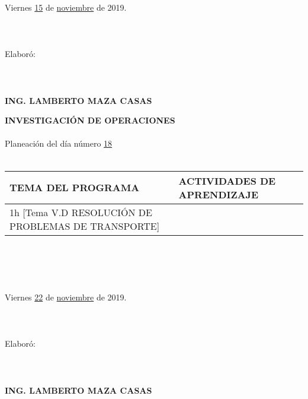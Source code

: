 \documentclass[landscape]{article}
\begin{document}
{\begin{center}
\ \\
\ \\
\ \\
Viernes \underline{\hspace{0.5cm}15\hspace{0.5cm}} de  \underline{\hspace{0.5cm}noviembre\hspace{0.5cm}} de 2019.
\ \\
\ \\
\ \\
\ \\
Elabor\'o:
\ \\
\ \\
\ \\
\ \\
{\bf ING. LAMBERTO MAZA CASAS}
\end{center}
\eject
\begin{center}
{\bf 
INVESTIGACI\'ON DE OPERACIONES
}
\ \\
\ \\
Planeaci\'on del d\'ia n\'umero \underline{\hspace{0.5cm}18\hspace{0.5cm}}
\ \\
\ \\
\begin{tabular}{|p{11cm}|p{8cm}|}\hline
{\bf TEMA DEL PROGRAMA}&{\bf ACTIVIDADES DE APRENDIZAJE}\\\hline
	1h	[Tema V.D RESOLUCI\'ON DE PROBLEMAS DE TRANSPORTE]
&\\
\hline
\end{tabular}
\ \\
\ \\
\ \\
\ \\
Viernes \underline{\hspace{0.5cm}22\hspace{0.5cm}} de  \underline{\hspace{0.5cm}noviembre\hspace{0.5cm}} de 2019.
\ \\
\ \\
\ \\
\ \\
Elabor\'o:
\ \\
\ \\
\ \\
\ \\
{\bf ING. LAMBERTO MAZA CASAS}
\end{center}
\eject
\begin{center}

\end{center}}
\end{document}
